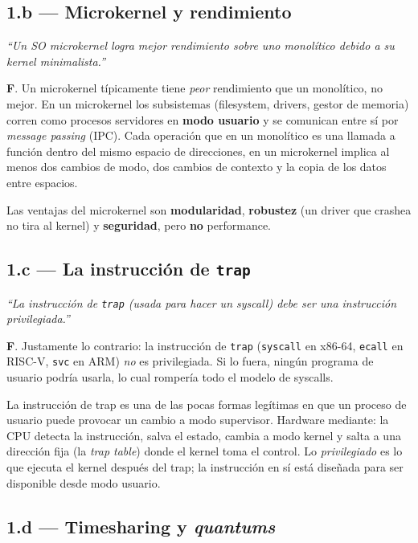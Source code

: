 \documentclass[11pt,a4paper]{article}
\begin{document}
\subsection*{1.b --- Microkernel y rendimiento}

\emph{``Un SO microkernel logra mejor rendimiento sobre uno monolítico
debido a su kernel minimalista.''}

\begin{respuesta}
\textbf{F}. Un microkernel típicamente tiene \emph{peor} rendimiento
que un monolítico, no mejor. En un microkernel los subsistemas
(filesystem, drivers, gestor de memoria) corren como procesos
servidores en \textbf{modo usuario} y se comunican entre sí por
\emph{message passing} (IPC). Cada operación que en un monolítico es
una llamada a función dentro del mismo espacio de direcciones, en un
microkernel implica al menos dos cambios de modo, dos cambios de
contexto y la copia de los datos entre espacios.

Las ventajas del microkernel son \textbf{modularidad}, \textbf{robustez}
(un driver que crashea no tira al kernel) y \textbf{seguridad}, pero
\textbf{no} performance.
\end{respuesta}

\subsection*{1.c --- La instrucción de \texttt{trap}}

\emph{``La instrucción de \texttt{trap} (usada para hacer un syscall)
debe ser una instrucción privilegiada.''}

\begin{respuesta}
\textbf{F}. Justamente lo contrario: la instrucción de \texttt{trap}
(\texttt{syscall} en x86-64, \texttt{ecall} en RISC-V, \texttt{svc} en
ARM) \emph{no} es privilegiada. Si lo fuera, ningún programa de
usuario podría usarla, lo cual rompería todo el modelo de syscalls.

La instrucción de trap es una de las pocas formas legítimas en que
un proceso de usuario puede provocar un cambio a modo supervisor.
Hardware mediante: la CPU detecta la instrucción, salva el estado,
cambia a modo kernel y salta a una dirección fija (la \emph{trap
table}) donde el kernel toma el control. Lo \emph{privilegiado} es lo
que ejecuta el kernel después del trap; la instrucción en sí está
diseñada para ser disponible desde modo usuario.
\end{respuesta}

\subsection*{1.d --- Timesharing y \emph{quantums}}
\end{document}
